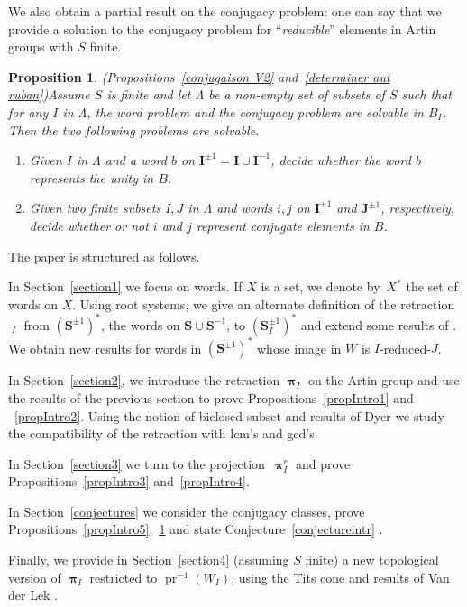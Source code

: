 \documentclass{amsart}
\numberwithin{equation}{section}
\newtheorem{proposition}[equation]{Proposition}
\newcommand\inv{^{-1}}
\newcommand\bI{{\mathbf I}}
\newcommand\bJ{{\mathbf J}}
\newcommand\bS{{\mathbf S}}
\DeclareMathOperator\pr{pr}
\DeclareMathOperator\hpi{\hat\pi}
\DeclareMathOperator\bpi{\boldsymbol\pi}
\begin{document}
We  also obtain a partial result on the conjugacy problem: one can say that we
provide a solution to the conjugacy problem for ``\emph{reducible}'' elements in
Artin groups with $S$ finite.

\begin{proposition}(Propositions~\ref{conjugaison V2} and~\ref{determiner aut ruban})\label{propIntro6}
Assume $S$ is finite and let $\Lambda$ be a non-empty set of subsets of $S$ such that for any $I$ in
$\Lambda$,  the word problem and the  conjugacy problem are solvable in $B_I$.
Then the two following problems are solvable.
\begin{enumerate}
\item Given $I$ in $\Lambda$ and a word $b$ on $\bI^{\pm 1}=\bI\cup\bI\inv$, decide whether the
word $b$ represents the unity in $B$.
\item  Given two finite subsets $I, J$ in $\Lambda$ and words $i, j$ on $\bI^{\pm 1}$
and $\bJ^{\pm 1}$, respectively, decide whether or not $i$ and $j$ represent
conjugate elements in $B$.
\end{enumerate}
\end{proposition}
 
The paper is structured as follows.

In  Section~\ref{section1} we  focus on  words.  If $X$ is a
set,  we denote by~$X^*$  the set of  words on $X$.  Using root systems, we
give  an alternate  definition of  the retraction  $\hpi_I$ from $(\bS^{\pm1})^*$,
the words on $\bS\cup\bS\inv$, 
\index{S@$\bS^{\pm1}$,   $(\bS^{\pm1})^*$}
to $(\bS_I^{\pm1})^*$  and extend some results of \cite{godelle}. We obtain new results
for   words  in  $(\bS^{\pm1})^*$  whose  image  in   $W$  is  $I$-reduced-$J$.  

In Section~\ref{section2},  we introduce the retraction $\bpi_I$ on the Artin
group and use the results of the previous section to prove
Propositions~\ref{propIntro1}  and ~\ref{propIntro2}.  Using the  notion of
biclosed  subset  and  results  of  Dyer  we study the compatibility of the
retraction  with lcm's and gcd's. 

In  Section~\ref{section3}  we  turn  to  the  projection~$\bpi^r_I$ and prove
Propositions~\ref{propIntro3}    and~\ref{propIntro4}.

In Section~\ref{conjectures} we consider the conjugacy classes,  prove
Propositions~\ref{propIntro5},~\ref{propIntro6} and state
Conjecture~\ref{conjectureintr} .

Finally, we provide in Section~\ref{section4} (assuming $S$ finite) a new topological version
of  $\bpi_I$ restricted to $\pr\inv(W_I)$, using  the Tits cone and results
of  Van der  Lek \cite{VanderLek}.  
\end{document}
